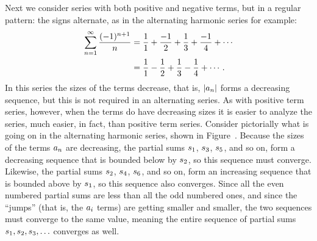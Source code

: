 \nobreak
Next we consider series with both positive and negative terms, but in
a regular pattern: the signs alternate, as in the {\dfont alternating
  harmonic series%
%
\/} for example:
\begin{align*}
  \sum_{n=1}^\infty {(-1)^{n+1}\over n}
  &={1\over1}+{-1\over2}+{1\over3}+{-1\over4}+\cdots \\
  &= {1\over1}-{1\over2}+{1\over3}-{1\over4}+\cdots.
\end{align*}
In this series the sizes of the terms decrease, that is, 
$\displaystyle |a_n|$ forms a decreasing sequence, but this is not required in an
alternating series. As with positive term series, however, when the
terms do have decreasing sizes it is easier to analyze the series,
much easier, in fact, than positive term series. Consider pictorially
what is going on in the alternating harmonic series, shown in
Figure~. Because the sizes of
the terms $\displaystyle a_n$ are decreasing, the partial sums $\displaystyle s_1$, $\displaystyle s_3$, $\displaystyle s_5$,
and so on, form a decreasing sequence that is bounded below by
$\displaystyle s_2$, so this sequence must converge.
Likewise, the partial sums $\displaystyle s_2$, $\displaystyle s_4$, $\displaystyle s_6$,
and so on, form an increasing sequence that is bounded above by
$\displaystyle s_1$, so this sequence also converges. Since all the even numbered
partial sums are less than all the odd numbered ones, and since the
``jumps'' (that is, the $\displaystyle a_i$ terms) are getting smaller and smaller,
the two sequences must converge to the same value, meaning the entire
sequence of partial sums $\displaystyle s_1,s_2,s_3,\ldots$ converges as well.

